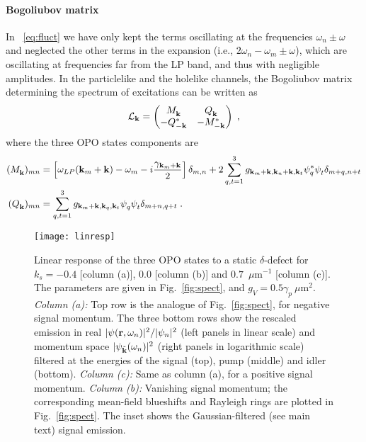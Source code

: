 \paragraph{Bogoliubov matrix}
In ~\eqref{eq:fluct} we have only kept the terms oscillating at the
frequencies $\omega_n \pm \omega$ and neglected the other terms in the
expansion (i.e., $2\omega_n - \omega_m \pm \omega$), which are
oscillating at frequencies far from the LP band, and thus with
negligible amplitudes.
%
In the particlelike and the holelike channels, the Bogoliubov matrix
determining the spectrum of excitations can be written
as~\cite{Wouters_2007}
%
\begin{equation}\label{eq:bogoliubov-opo}
  \mathcal{L}_{\mathbf{k}} = \begin{pmatrix} M_{\mathbf{k}}^{} & Q_{\mathbf{k}}^{}
    \\ -Q_{-\mathbf{k}}^* & -M_{-\mathbf{k}}^* \end{pmatrix} \; ,
\end{equation}
%
where the three OPO states components are
%
\begin{align}
  (M_{\vt{k}}^{})_{mn} &= \left[\omega_{LP}({\vt{k}_m + \vt{k}})
    - \omega_m - i\frac{\gamma_{\vt{k}_m + \vt{k}}}{2}\right]
  \delta_{m,n}
   + 2\sum_{q,t=1}^3
  g_{\vt{k}_m+\vt{k},\vt{k}_n+\vt{k},\vt{k}_t} \psi_q^*
  \psi_t^{} \delta_{m+q,n+t}\nonumber\\
%
  (Q_{\vt{k}}^{})_{mn} &= \sum_{q,t=1}^3
  g_{\vt{k}_m+\vt{k},\vt{k}_q,\vt{k}_t} \psi_q^{} \psi_t^{}
  \delta_{m+n,q+t}\; .
\end{align}
\begin{figure}[tb]
\centering
\texttt{[image: linresp]}
\caption{Linear response of the three OPO states to a static
  $\delta$-defect for $k_s = -0.4$ [column (a)], $0.0$ [column (b)] and
  $0.7$~$\mu$m$^{-1}$ [column (c)]. The parameters are given in
  Fig.~\ref{fig:spect}, and $g_V = 0.5 \gamma_p~\mu$m$^2$.  \emph{Column
    (a):} Top row is the analogue of Fig.~\ref{fig:spect}, for negative
  signal momentum. The three bottom rows show the rescaled emission in
  real $|\psi (\mathbf{r},\omega_n)|^2/|\psi_n|^2$ (left panels in linear
  scale) and momentum space $|\psi_{\tilde{\mathbf{k}}} (\omega_n)|^2$
  (right panels in logarithmic scale) filtered at the energies of the
  signal (top), pump (middle) and idler (bottom).  \emph{Column (c):} Same
  as column (a), for a positive signal momentum.  \emph{Column (b):}
  Vanishing signal momentum; the corresponding mean-field blueshifts and
  Rayleigh rings are plotted in Fig.~\ref{fig:spect}. The inset shows
  the Gaussian-filtered (see main text) signal emission.}
\label{fig:ereal}
\end{figure}
%

